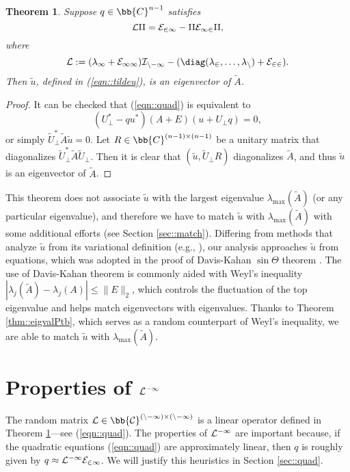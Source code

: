 \documentclass[12pt]{article}%
\theoremstyle{plain}%
\newtheorem{thm}{Theorem}[section]
\theoremstyle{remark}
\begin{document}
\begin{thm}\label{thm::quadEqn}
Suppose $q \in \bb{C}^{n-1}$ satisfies
\begin{equation}\label{eqn::quad}
\cal{L} q = E_{21} - qE_{12}q,
\end{equation}
where
\begin{equation*}
\cal{L} := (\lambda_1 + E_{11}) I_{n-1} - ( \diag(\lambda_2,\ldots, \lambda_n) + E_{22} ).
\end{equation*}
Then $\tilde{u}$, defined in (\ref{eqn::tildeu}), is an eigenvector of $\tilde{A}$.
\end{thm}

\begin{proof}
It can be checked that (\ref{eqn::quad}) is equivalent to 
\begin{equation*}
(U_\bot^* - qu^*) ( A + E) (u + U_\bot q) = 0,
\end{equation*}
or simply $\tilde{U}_\bot^* \tilde{A} \tilde{u} = 0$. Let $R \in \bb{C}^{(n-1) \times (n-1)}$ be a unitary matrix that diagonalizes $\tilde{U}_\bot^* \tilde{A}\tilde{U}_\bot$. Then it is clear that $(\tilde{u}, \tilde{U}_\bot R)$ diagonalizes $\tilde{A}$, and thus $\tilde{u}$ is an eigenvector of $\tilde{A}$.
\end{proof}
This theorem does not associate $\tilde{u}$ with the largest eigenvalue $\lambda_{\max}(\tilde{A})$ (or any particular eigenvalue), and therefore we have to match $\tilde{u}$ with $\lambda_{\max}(\tilde{A})$ with some additional efforts (see Section \ref{sec::match}). Differing from methods that analyze $\tilde{u}$ from its variational definition (e.g., \cite{Vu11}), our analysis approaches $\tilde{u}$ from equations, which was adopted in the proof of Davis-Kahan $\sin \Theta$ theorem \citep{DavKah70}. The use of Davis-Kahan theorem is commonly aided with Weyl's inequality $| \lambda_j(\tilde{A}) - \lambda_j(A)| \le \| E \|_2$, which controls the fluctuation of the top eigenvalue and helps match eigenvectors with eigenvalues. Thanks to Theorem \ref{thm::eigvalPtb}, which serves as a random counterpart of Weyl's inequality, we are able to match $\tilde{u}$ with $\lambda_{\max}(\tilde{A})$.



\section{Properties of $\cal{L}^{-1}$}\label{sec::L-1}

The random matrix $\cal{L} \in \bb{C}^{(n-1) \times (n-1)}$ is a linear operator defined in Theorem \ref{thm::quadEqn}---see (\ref{eqn::quad}). The properties of $\cal{L}^{-1}$ are important because, if the quadratic equations (\ref{eqn::quad}) are approximately linear, then $q$ is roughly given by $q \approx \cal{L}^{-1} E_{21}$. We will justify this heuristics in Section \ref{sec::quad}.
\end{document}
